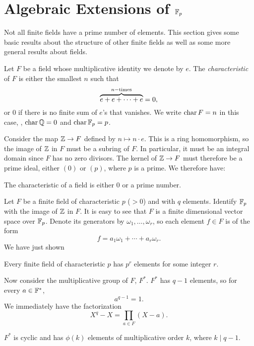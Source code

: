 \section{Algebraic Extensions of \texorpdfstring{$\mathbb{F}_p$}{Fp}}
\label{FF:AlgExt:Sec}

Not all finite fields have a prime number of elements.  This section
gives some basic results about the structure of other finite fields
as well as some more general results about fields.  

Let $F$ be a field whose multiplicative identity we denote by $e$.
The {\em characteristic} of $F$ is
either the smallest $n$ such that 
\[
\overbrace{e + e + \cdots + e}^{n-{\rm times}} = 0,
\]
or $0$ if there is no finite sum of $e$'s that vanishes.  We write
$\mathop{\rm char}\nolimits F = n$ in this case, \eg, $\mathop{\rm char}\nolimits \mathbb{Q} = 0$ and $\mathop{\rm char}\nolimits \mathbb{F}_p = p$.

Consider the map $\mathbb{Z}\rightarrow F$ defined by $n \mapsto n \cdot e$.
This is a ring homomorphism, so the image of $\mathbb{Z}$ in $F$ must be a
subring of $F$.  In particular, it must be an integral domain since
$F$ has no zero divisors.   The kernel of $\mathbb{Z} \rightarrow F$ must
therefore be a prime ideal, either $(0)$ or $(p)$, where $p$ is a
prime.  We therefore have:
\begin{proposition}
The characteristic of a field is either $0$ or a prime number.
\end{proposition}

Let $F$ be a finite field of characteristic $p$ ($> 0$) and with $q$
elements.  Identify $\mathbb{F}_p$ with the image of $\mathbb{Z}$ in $F$.  It is easy
to see that $F$ is a finite dimensional vector space over $\mathbb{F}_p$.
Denote its generators by $\omega_1, \ldots, \omega_r$, so each element
$f \in F$ is of the form
\[
f = a_1 \omega_1 + \cdots + a_r \omega_r.
\]
We have just shown
\begin{proposition}
Every finite field of characteristic $p$ has $p^r$ elements for some
integer $r$.
\end{proposition}

Now consider the multiplicative group of $F$, $F^{\ast}$.  $F^{\ast}$
has $q-1$ elements, so for every $a \in \mathbb{F}^{\ast}$, 
\[
a^{q-1} = 1.
\]
We immediately have the factorization
\[
X^q - X = \prod_{a \in F} (X - a).
\]

\begin{proposition} \label{FF:AlgExtOrder:Prop}
$F^{\ast}$ is cyclic and has $\phi(k)$ elements of multiplicative order
$k$, where $k\mid q-1$.
\end{proposition}

